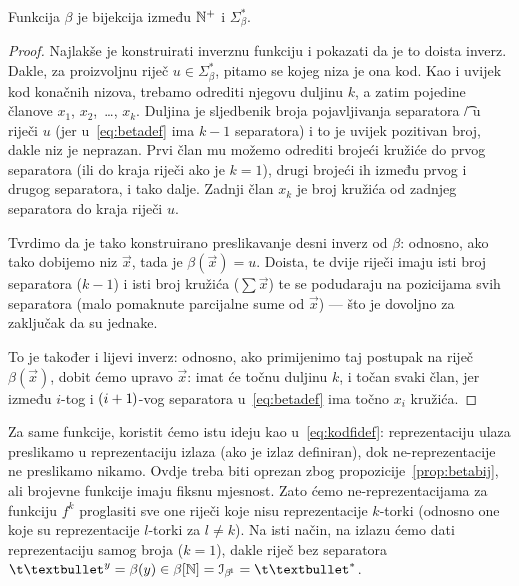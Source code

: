 \begin{propozicija}[{name=[bijektivnost binarne reprezentacije]}]\label{prop:betabij}
Funkcija $\beta$ je bijekcija između ${\mathbb N}^+$ i $\Sigma_\beta^*$.
\end{propozicija}
\begin{proof}
Najlakše je konstruirati inverznu funkciju i pokazati da je to doista inverz. Dakle, za proizvoljnu riječ $u\in\Sigma_\beta^*$, pitamo se kojeg niza je ona kod. Kao i uvijek kod konačnih nizova, trebamo odrediti njegovu duljinu $k$, a zatim pojedine članove $x_1$, $x_2$,~\ldots, $x_k$. Duljina je sljedbenik broja pojavljivanja separatora \t/ u riječi $u$ (jer u~\eqref{eq:betadef} ima $k-1$ separatora) i to je uvijek pozitivan broj, dakle niz je neprazan. Prvi član mu možemo odrediti brojeći kružiće do prvog separatora (ili do kraja riječi ako je $k=1$), drugi brojeći ih između prvog i drugog separatora, i tako dalje. Zadnji član $x_k$ je broj kružića od zadnjeg separatora do kraja riječi $u$.

Tvrdimo da je tako konstruirano preslikavanje desni inverz od $\beta$: odnosno, ako tako dobijemo niz $\vec x$, tada je $\beta(\vec x)=u$. Doista, te dvije riječi imaju isti broj separatora ($k-1$) i isti broj kružića ($\sum\vec x$) te se podudaraju na pozicijama svih separatora (malo pomaknute parcijalne sume od $\vec x$) --- što je dovoljno za zaključak da su jednake.

	To je također i lijevi inverz: odnosno, ako primijenimo taj postupak na riječ $\beta(\vec x)$, dobit ćemo upravo $\vec x$: imat će točnu duljinu $k$, i točan svaki član, jer između $i$-tog i $(i+1\mspace{-1mu})$-vog separatora u~\eqref{eq:betadef} ima točno $x_i$ kružića.
\end{proof}

Za same funkcije, koristit ćemo istu ideju kao u~\eqref{eq:kodfidef}: reprezentaciju ulaza preslikamo u reprezentaciju izlaza (ako je izlaz definiran), dok ne-reprezentacije ne preslikamo nikamo. Ovdje treba biti oprezan zbog propozicije~\ref{prop:betabij}, ali brojevne funkcije imaju fiksnu mjesnost. Zato ćemo ne-reprezentacijama za funkciju $f^k$ proglasiti sve one riječi koje nisu reprezentacije $k$-torki (odnosno one koje su reprezentacije $l$-torki za $l\ne k$). Na isti način, na izlazu ćemo dati reprezentaciju samog broja ($k=1$), dakle riječ bez separatora $\t\textbullet^y=\beta(y)\in\beta[\N]=\im{\beta^{\!1}}=\t\textbullet^*$.

